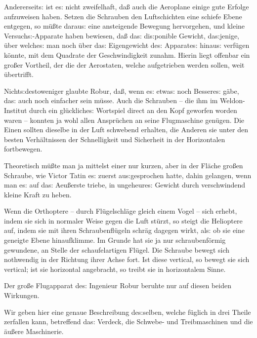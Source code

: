 \documentclass[oneside,12pt]{book}
\newcommand{\s}{s:}
\begin{document}
Andererseit{\s} ist e{\s} nicht zweifelhaft, da{\ss} auch die
Aeroplane einige gute Erfolge aufzuweisen haben. Setzen die Schrauben
den Luftschichten eine schiefe Ebene entgegen, so m\"u{\ss}te
darau{\s} eine ansteigende Bewegung hervorgehen, und kleine
Versuch{\s}-Apparate haben bewiesen, da{\ss} da{\s} di{\s}ponible
Gewicht, da{\s}jenige, \"uber welche{\s} man noch \"uber da{\s}
Eigengewicht de{\s} Apparate{\s} hinau{\s} verf\"ugen k\"onnte, mit
dem Quadrate der Geschwindigkeit zunahm. Hierin liegt offenbar ein
gro{\ss}er Vortheil, der die der Aerostaten, welche aufgetrieben
werden sollen, weit \"ubertrifft.

Nicht{\s}destoweniger glaubte Robur, da{\ss}, wenn e{\s} etwa{\s}
noch Bessere{\s} g\"abe, da{\s} auch noch einfacher sein m\"usse.
Auch die Schrauben -- die ihm im Weldon-Institut durch ein
gl\"uckliche{\s} Wortspiel direct an den Kopf geworfen worden waren
-- konnten ja wohl allen Anspr\"uchen an seine Flugmaschine
gen\"ugen. Die Einen sollten dieselbe in der Luft schwebend erhalten,
die Anderen sie unter den besten Verh\"altnissen der Schnelligkeit
und Sicherheit in der Horizontalen fortbewegen.

Theoretisch m\"u{\ss}te man ja mittelst einer nur kurzen, aber in der
Fl\"ache gro{\ss}en Schraube, wie Victor Tatin e{\s} zuerst
au{\s}gesprochen hatte, dahin gelangen, {\glqq}wenn man e{\s} auf
da{\s} Aeu{\ss}erste triebe, in ungeheure{\s} Gewicht durch
verschwindend kleine Kraft zu heben{\grqq}.

Wenn die Orthoptere -- durch Fl\"ugelschl\"age gleich einem Vogel --
sich erhebt, indem sie sich in normaler Weise gegen die Luft
st\"urzt, so steigt die Helioptere auf, indem sie mit ihren
Schraubenfl\"ugeln schr\"ag dagegen wirkt, al{\s} ob sie eine
geneigte Ebene hinaufklimme. Im Grunde hat sie ja nur
schraubenf\"ormig gewundene, an Stelle der schaufelartigen Fl\"ugel.
Die Schraube bewegt sich nothwendig in der Richtung ihrer Achse fort.
Ist diese vertical, so bewegt sie sich vertical; ist sie horizontal
angebracht, so treibt sie in horizontalem Sinne.

Der gro{\ss}e Flugapparat de{\s} Ingenieur Robur beruhte nur auf
diesen beiden Wirkungen.

Wir geben hier eine genaue Beschreibung de{\s}selben, welche
f\"uglich in drei Theile zerfallen kann, betreffend da{\s} Verdeck,
die Schwebe- und Treibmaschinen und die \"au{\ss}ere Maschinerie.
\end{document}
